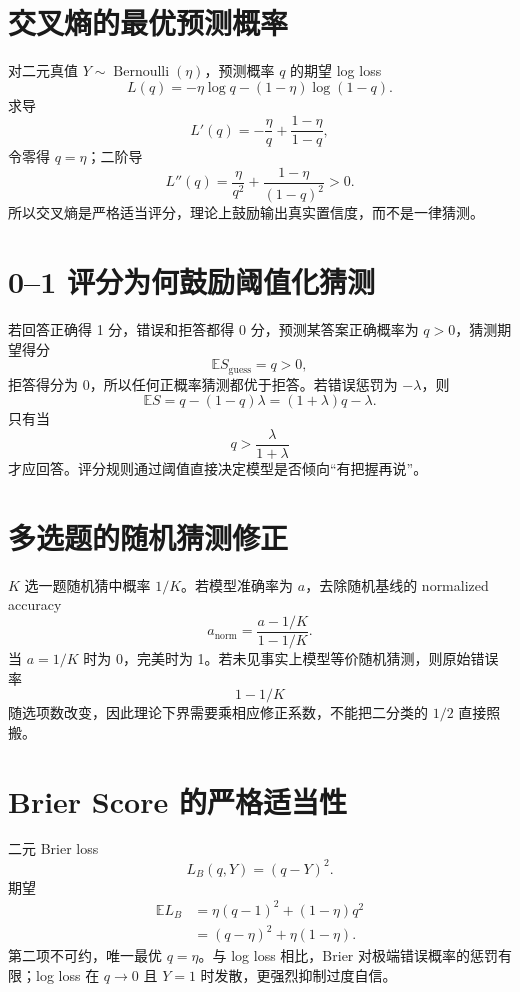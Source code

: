 \documentclass[UTF8,12pt,a4paper,fontset=none]{ctexart}
\numberwithin{equation}{section}
\newcommand{\E}{\mathbb{E}}
\begin{document}
\section{交叉熵的最优预测概率}
对二元真值 $Y\sim\operatorname{Bernoulli}(\eta)$，预测概率 $q$ 的期望 log loss
\begin{equation}
 L(q)=-\eta\log q-(1-\eta)\log(1-q).
\end{equation}
求导
\begin{equation}
 L'(q)=-\frac\eta q+\frac{1-\eta}{1-q},
\end{equation}
令零得 $q=\eta$；二阶导
\begin{equation}
 L''(q)=\frac\eta{q^2}+\frac{1-\eta}{(1-q)^2}>0.
\end{equation}
所以交叉熵是严格适当评分，理论上鼓励输出真实置信度，而不是一律猜测。

\section{0--1 评分为何鼓励阈值化猜测}
若回答正确得 1 分，错误和拒答都得 0 分，预测某答案正确概率为 $q>0$，猜测期望得分
\begin{equation}
 \E S_{\mathrm{guess}}=q>0,
\end{equation}
拒答得分为 0，所以任何正概率猜测都优于拒答。若错误惩罚为 $-\lambda$，则
\begin{equation}
 \E S=q-(1-q)\lambda
 =(1+\lambda)q-\lambda.
\end{equation}
只有当
\begin{equation}
 q>\frac{\lambda}{1+\lambda}
\end{equation}
才应回答。评分规则通过阈值直接决定模型是否倾向“有把握再说”。

\section{多选题的随机猜测修正}
$K$ 选一题随机猜中概率 $1/K$。若模型准确率为 $a$，去除随机基线的 normalized accuracy
\begin{equation}
 a_{\mathrm{norm}}=\frac{a-1/K}{1-1/K}.
\end{equation}
当 $a=1/K$ 时为 0，完美时为 1。若未见事实上模型等价随机猜测，则原始错误率
\begin{equation}
 1-1/K
\end{equation}
随选项数改变，因此理论下界需要乘相应修正系数，不能把二分类的 $1/2$ 直接照搬。

\section{Brier Score 的严格适当性}
二元 Brier loss
\begin{equation}
 L_B(q,Y)=(q-Y)^2.
\end{equation}
期望
\begin{align}
 \E L_B
 &=\eta(q-1)^2+(1-\eta)q^2\\
 &=(q-\eta)^2+\eta(1-\eta).
\end{align}
第二项不可约，唯一最优 $q=\eta$。与 log loss 相比，Brier 对极端错误概率的惩罚有限；log loss 在 $q\to0$ 且 $Y=1$ 时发散，更强烈抑制过度自信。
\end{document}

